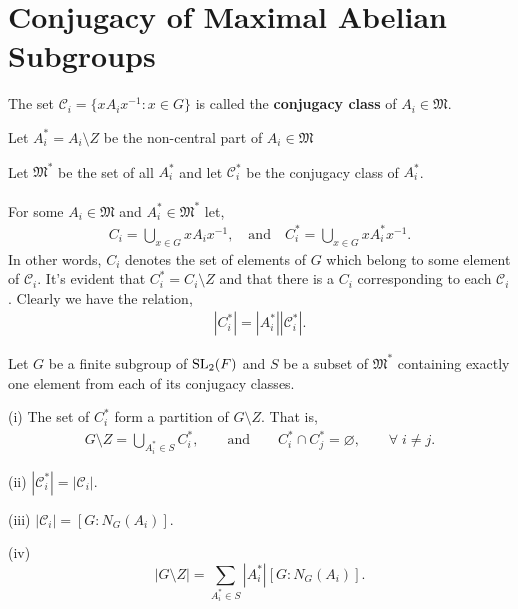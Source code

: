 \section{Conjugacy of Maximal Abelian Subgroups}

\begin{definition}
  \label{ConjClassOfSet}
  \leanok
  The set $\mathcal{C}_i = \{ x A_i x^{-1} : x \in G \}$ is called the \textbf{conjugacy class} of $A_i \in \mathfrak{M}$.
\end{definition}

\begin{definition}
  \label{Subgroup.noncenter}
  \leanok
  Let $A_i^* = A_i \setminus Z$ be the non-central part of $A_i \in \mathfrak{M}$
\end{definition}

\begin{definition}
\label{noncenter_MaximalAbelianSubgroups}
\leanok
Let $\mathfrak{M}^*$ be the set of all $A_i^*$ and let $\mathcal{C}_i^*$ be the conjugacy class of $A_i^*$. \\
\\
For some $A_i \in \mathfrak{M}$ and $A_i^* \in \mathfrak{M}^*$ let,
\begin{align*} C_i = \bigcup\limits_{x \in G} x A_i x^{-1}, \quad \text{and} \quad  C_i^* = \bigcup\limits_{x \in G} x A_i^* x^{-1}.
\end{align*}
In other words, $C_i$ denotes the set of elements of $G$ which belong to some element of $\mathcal{C}_i$. It's evident that $C_i^* = C_i \setminus Z$ and that there is a $C_i$ corresponding to each $\mathcal{C}_i$. Clearly we have the relation,
\begin{align}\label{orderorder} |C_i^*| = |A_i^*||\mathcal{C}_i^*|.
\end{align}
\end{definition}

\begin{theorem} \label{partitiontheorem} Let $G$ be a finite subgroup of $\operatorname{SL}_2(F)$ and $S$ be a subset of $\mathfrak{M}^*$  containing exactly one element from each of its conjugacy classes. \vspace{2mm}

(i) The set of $C_i^*$ form a partition of $G \! \setminus \! Z$. That is,
\begin{align*} G \! \setminus \! Z = \bigcup\limits_{A_i^* \in S} C_i^*,  \qquad \text{and}  \qquad C_i^* \cap C_j^* = \varnothing, \qquad \forall \;  i \neq j.
\end{align*}

(ii) \: \! $|\mathcal{C}_i^*| = |\mathcal{C}_i|$. \vspace{4mm}

(iii) \: $|\mathcal{C}_i| = [G : N_G(A_i)]$. \vspace{4mm}

(iv) $$|G \! \setminus  \! Z| = \sum_{A_i^* \in S} |A_i^*| [G:N_G(A_i)].$$

\end{theorem}

